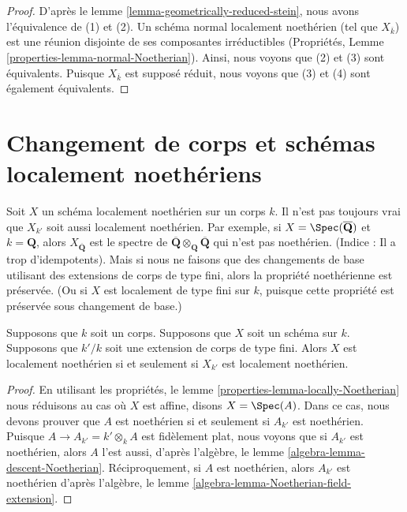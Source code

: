 \begin{proof}
D'après le lemme
\ref{lemma-geometrically-reduced-stein}, nous avons
l'équivalence de (1) et (2). Un schéma normal localement
noethérien (tel que $X_{\overline{k}}$) est une réunion
disjointe de ses composantes irréductibles (Propriétés, Lemme
\ref{properties-lemma-normal-Noetherian}). Ainsi, nous voyons que
(2) et (3) sont équivalents. Puisque $X_{\overline{k}}$ est
supposé réduit, nous voyons que (3) et (4) sont également équivalents.
\end{proof}









\section{Changement de corps et schémas localement noethériens}
\label{section-locally-Noetherian}

\noindent
Soit $X$ un schéma localement noethérien sur un corps $k$. Il n'est pas
toujours vrai que $X_{k'}$ soit aussi localement noethérien. Par
exemple, si $X = \Spec(\overline{\mathbf{Q}})$ et $k = \mathbf{Q}$,
alors $X_{\overline{\mathbf{Q}}}$ est le spectre de
$\overline{\mathbf{Q}} \otimes_{\mathbf{Q}} \overline{\mathbf{Q}}$ qui n'est
pas noethérien. (Indice : Il a trop d'idempotents). Mais si nous ne faisons
que des changements de base utilisant des extensions de corps de type fini,
alors la propriété noethérienne est préservée. (Ou si $X$ est localement de
type fini sur $k$, puisque cette propriété est préservée sous changement de base.)

\begin{lemma}
\label{lemma-locally-Noetherian-base-change}
Supposons que $k$ soit un corps. Supposons
que $X$ soit un schéma sur $k$. Supposons que
$k'/k$ soit une extension de corps de type
fini. Alors $X$ est localement noethérien si et
seulement si $X_{k'}$ est localement noethérien.
\end{lemma}

\begin{proof}
En utilisant les propriétés, le lemme
\ref{properties-lemma-locally-Noetherian} nous réduisons au cas où
$X$ est affine, disons $X = \Spec(A)$. Dans ce cas, nous devons
prouver que $A$ est noethérien si et seulement si $A_{k'}$ est
noethérien. Puisque $A \to A_{k'} = k' \otimes_k A$ est fidèlement
plat, nous voyons que si $A_{k'}$ est noethérien, alors $A$ l'est
aussi, d'après l'algèbre, le lemme
\ref{algebra-lemma-descent-Noetherian}. Réciproquement, si $A$ est noethérien, alors
$A_{k'}$ est noethérien d'après l'algèbre, le lemme \ref{algebra-lemma-Noetherian-field-extension}.
\end{proof}







